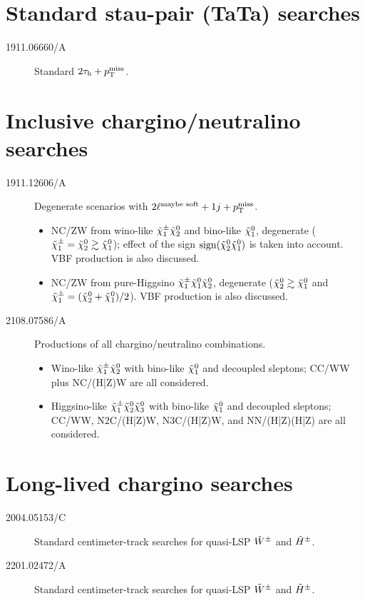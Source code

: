 \section[Standard TaTa searches]{Standard stau-pair (TaTa) searches}
\begin{description}
\item[1911.06660/A] Standard $2\tauh+\mpT$.
\end{description}


\section[Inclusive ino searches]{Inclusive chargino/neutralino searches}
\begin{description}
\item[1911.12606/A] Degenerate scenarios with $2\ell\wup*{maybe soft}+1j+\mpT$.
\begin{itemize}
 \item NC/ZW from wino-like $\charPM[1]\neut[2]$ and bino-like $\neut[1]$, degenerate ($\charPM[1]=\neut[2]\gtrsim\neut[1]$); effect of the sign $\sign(\neut[2]\neut[1])$ is taken into account. VBF production is also discussed.
 \item NC/ZW from pure-Higgsino $\charPM[1]\neut[1]\neut[2]$, degenerate ($\neut[2]\gtrsim\neut[1]$ and $\charPM[1]=(\neut[2]+\neut[1])/2$). VBF production is also discussed.
\end{itemize}
\item[2108.07586/A] Productions of all chargino/neutralino combinations.
\begin{itemize}
 \item Wino-like $\charPM[1]\neut[2]$ with bino-like $\neut[1]$ and decoupled sleptons; CC/WW plus NC/(H|Z)W are all considered.
 \item Higgsino-like $\charPM[1]\neut[2]\neut[3]$ with bino-like $\neut[1]$ and decoupled sleptons; CC/WW, N2C/(H|Z)W, N3C/(H|Z)W, and NN/(H|Z)(H|Z) are all considered.
\end{itemize}
\end{description}


\section[Long-lived chargino searches]{Long-lived chargino searches}
\begin{description}
\item[2004.05153/C] Standard centimeter-track searches for quasi-LSP $\winoPM$ and $\hinoPM$.
\item[2201.02472/A] Standard centimeter-track searches for quasi-LSP $\winoPM$ and $\hinoPM$.
\end{description}








